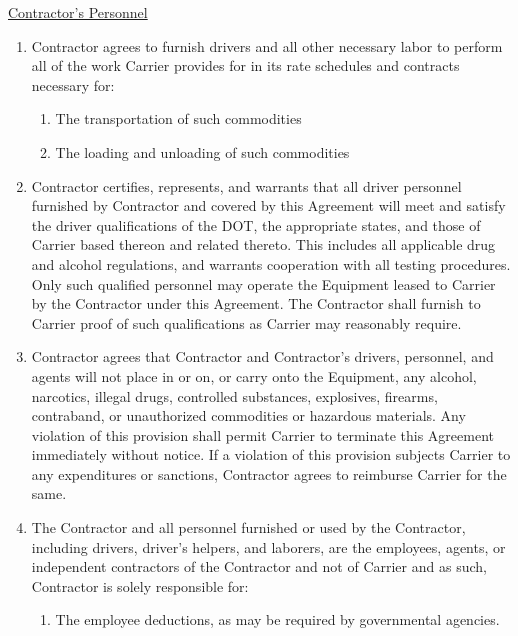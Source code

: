 \newcommand{\PhysicalQualificationsAndExaminationsFootnote}{%
    \textbf{The Office of the Federal Register}:
    \textsl{Title 49 -- Part 391: Subpart E --- Physical Qualifications
    and Examinations} \\
    \href
        {https://www.ecfr.gov/current/title-49/part-391/subpart-E}
        {https://www.ecfr.gov/current/title-49/part-391/subpart-E}
}

\underline{Contractor's Personnel}
\begin{enumerate}
    \item Contractor agrees to furnish drivers and all other necessary
    labor to perform all of the work Carrier provides for in its rate
    schedules and contracts necessary for:
    \begin{enumerate}
        \item The transportation of such commodities
        
        \item The loading and unloading of such commodities
    \end{enumerate}

    \item Contractor certifies, represents, and warrants that all driver
    personnel furnished by Contractor and covered by this Agreement will
    meet and satisfy the driver qualifications of the DOT, the appropriate
    states, and those of Carrier based thereon and related thereto. This
    includes all applicable drug and alcohol regulations, and warrants
    cooperation with all testing procedures. Only such qualified personnel
    may operate the Equipment leased to Carrier by the Contractor under
    this Agreement. The Contractor shall furnish to Carrier proof of such
    qualifications as Carrier may reasonably require.

    \item Contractor agrees that Contractor and Contractor's drivers,
    personnel, and agents will not place in or on, or carry onto the
    Equipment, any alcohol, narcotics, illegal drugs, controlled
    substances, explosives, firearms, contraband, or unauthorized
    commodities or hazardous materials. Any violation of this provision
    shall permit Carrier to terminate this Agreement immediately without
    notice. If a violation of this provision subjects Carrier to any
    expenditures or sanctions, Contractor agrees to reimburse Carrier for
    the same.

    \item The Contractor and all personnel furnished or used by the
    Contractor, including drivers, driver's helpers, and laborers, are the
    employees, agents, or independent contractors of the Contractor and not
    of Carrier and as such, Contractor is solely responsible for:
    \begin{enumerate}
        \item The employee deductions, as may be required by governmental
        agencies.
        

\end{enumerate}
\end{enumerate}

